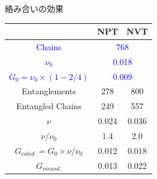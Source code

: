 \documentclass[12pt, dvipdfmx]{beamer}
\begin{document}
\begin{frame}
\begin{columns}[T, onlytextwidth]
\begin{block}{絡み合いの効果}
                \vspace{-3mm}
                \scriptsize
                \begin{center}
                    \begin{tabular}{c|c|c} \hline
                        &NPT & NVT \\ \hline \hline
                        \textcolor{blue}{Chains} & \multicolumn{2}{|c}{\textcolor{blue}{768}}\\ \hline
                        \textcolor{blue}{$\nu_0$}& \multicolumn{2}{|c}{\textcolor{blue}{0.018}}\\ \hline
                        \textcolor{blue}{$G_0 = \nu_0\times (1-2/4)$}&\multicolumn{2}{|c}{\textcolor{blue}{0.009}} \\ \hline \hline
                        Entanglements& 278& 800\\ \hline
                        Entangled Chains&249&557 \\ \hline
                        \alert{$\nu$}& \alert{0.024}&\alert{0.036}\\ \hline
                        $\nu/\nu_0$& 1.4& 2.0 \\ \hline
                        $G_{calcd.}=G_0 \times \nu/\nu_0$ & \alert{0.012} & 0.018 \\ \hline \hline
                        $G_{measd.}$ & \alert{0.013} & 0.022 \\ \hline
                    \end{tabular}
                \end{center}
            \end{block}
        \end{columns}
\end{frame}
\end{document}

